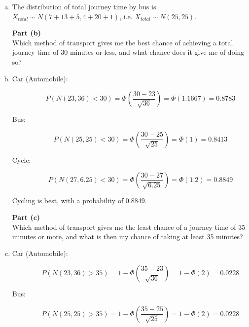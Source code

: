 \documentclass[a4paper,12pt]{article}
\begin{document}
	\begin{enumerate}[(a)]
		\large
		\item The distribution of total journey time by bus is $X_{total} \sim N(7+13+5, 4+20+1)$, i.e. $X_{total} \sim N(25,25)$.
		
		\newpage
		\begin{framed}
			\noindent \textbf{Part (b)}\\ \large 
			\noindent \large Which method of transport gives me the best chance of achieving a total
			journey time of 30 minutes or less, and what chance does it give me of doing
			so?
		\end{framed}
		\item
		
		\begin{description}
			\item[Car (Automobile):]
			\[P (N(23,36) < 30)  = \Phi \left( \frac{30- 23}{\sqrt{36}} \right)  = \Phi(1.1667) = 0.8783\]
			
			
			\large 
			\item[Bus:]
			\[P (N(25,25) < 30)  = \Phi \left( \frac{30- 25}{\sqrt{25}} \right)  = \Phi(1) = 0.8413\]
			
			\item[Cycle: ]
			\[P (N(27,6.25) < 30)  = \Phi \left( \frac{30 -27}{\sqrt{6.25}} \right)  = \Phi(1.2) = 0.8849\]
			
		\end{description}
		
		Cycling is best, with a probability of 0.8849.
		\newpage
		\begin{framed}
			\noindent \textbf{Part (c)}\\ \large 
			\noindent \large  Which method of transport gives me the least chance of a journey time of 35
			minutes or more, and what is then my chance of taking at least 35 minutes?
		\end{framed}
		\item 
		\large 
		\begin{description}
			\item[Car (Automobile):]
			\[P (N(23,36) >35)  = 1- \Phi \left( \frac{35- 23}{\sqrt{36}} \right)  = 1- \Phi(2) = 0.0228\]
			
			\item[Bus:]
			\[P (N(25,25) >35)  = 1- \Phi \left( \frac{35- 25}{\sqrt{25}} \right)  = 1- \Phi(2) = 0.0228\]
			

\end{description}
\end{enumerate}
\end{document}

